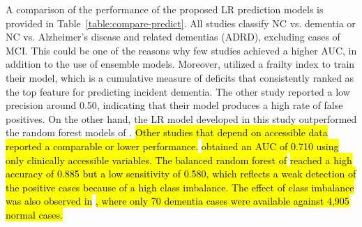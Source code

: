 A comparison of the performance of the proposed LR prediction models is provided in Table~\ref{table:compare-predict}. All studies classify NC vs. dementia or NC vs. Alzheimer's disease and related dementias (\acrshort{ADRD}), excluding cases of MCI. This could be one of the reasons why few studies \cite{Akter2025Using, Georgiev2024Predicting, Li2023Early} achieved a higher AUC, in addition to the use of ensemble models. Moreover,  utilized a frailty index to train their model, which is a cumulative measure of deficits that consistently ranked as the top feature for predicting incident dementia. The other study \cite{Li2023Early} reported a low precision around 0.50, indicating that their model produces a high rate of false positives. On the other hand, the LR model developed in this study outperformed the random forest models of \cite{Ben2020Predicting, Park2020Machine}. \hl{Other studies that depend on accessible data reported a comparable or lower performance.}  \hl{obtained an AUC of 0.710 using only clinically accessible variables. The balanced random forest of}  \hl{reached a high accuracy of 0.885 but a low sensitivity of 0.580, which reflects a weak detection of the positive cases because of a high class imbalance. The effect of class imbalance was also observed in} \hl{, where only 70 dementia cases were available against 4,905 normal cases.}

